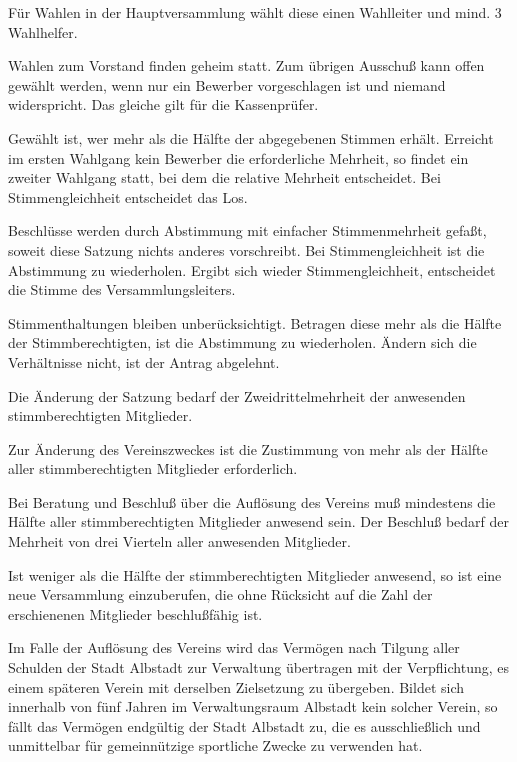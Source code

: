 \documentclass[11pt,a4paper,parskip=half]{scrartcl}
\begin{document}
\begin{contract}
\begin{multicols}{2}
    Für Wahlen in der Hauptversammlung wählt diese einen Wahlleiter und mind. 3 Wahlhelfer.

    Wahlen zum Vorstand finden geheim statt.
    Zum übrigen Ausschuß kann offen gewählt werden,
    wenn nur ein Bewerber vorgeschlagen ist und niemand widerspricht.
    Das gleiche gilt für die Kassenprüfer.

    Gewählt ist,
    wer mehr als die Hälfte der  abgegebenen Stimmen erhält.
    Erreicht im ersten Wahlgang kein Bewerber die erforderliche Mehrheit,
    so findet ein zweiter Wahlgang statt,
    bei dem die relative Mehrheit entscheidet.
    Bei Stimmengleichheit entscheidet das Los.

    Beschlüsse werden durch Abstimmung mit einfacher Stimmenmehrheit gefaßt,
    soweit diese Satzung nichts anderes vorschreibt.
    Bei Stimmengleichheit ist die Abstimmung zu wiederholen.
    Ergibt sich wieder Stimmengleichheit,
    entscheidet die Stimme des Versammlungsleiters.

    Stimmenthaltungen bleiben unberücksichtigt.
    Betragen diese mehr als die Hälfte der Stimmberechtigten,
    ist die Abstimmung zu wiederholen.
    Ändern sich die Verhältnisse nicht,
    ist der Antrag abgelehnt.

    Die Änderung der Satzung bedarf der Zweidrittelmehrheit der anwesenden stimmberechtigten Mitglieder.

    Zur Änderung des Vereinszweckes ist die Zustimmung von mehr als der Hälfte aller stimmberechtigten Mitglieder erforderlich.

    Bei Beratung und Beschluß über die Auflösung des Vereins muß mindestens die Hälfte aller stimmberechtigten Mitglieder anwesend sein.
    Der Beschluß bedarf der Mehrheit von drei Vierteln aller anwesenden Mitglieder.

    Ist weniger als die Hälfte der stimmberechtigten Mitglieder anwesend,
    so ist eine neue Versammlung einzuberufen,
    die ohne Rücksicht auf die Zahl der erschienenen Mitglieder beschlußfähig ist.

    Im Falle der Auflösung des Vereins wird das Vermögen nach Tilgung aller Schulden der Stadt Albstadt zur Verwaltung übertragen mit der Verpflichtung,
    es einem späteren Verein mit derselben Zielsetzung zu übergeben.
    Bildet sich innerhalb von fünf Jahren im Verwaltungsraum Albstadt kein solcher Verein,
    so fällt das Vermögen endgültig der Stadt Albstadt zu,
    die es ausschließlich und unmittelbar für gemeinnützige sportliche Zwecke zu verwenden hat.
    \end{multicols}
  \end{contract}
\end{document}
